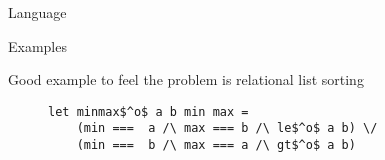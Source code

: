 \documentclass[final]{beamer}
\newlength{\onecolwid}
\begin{document}
\begin{frame}[fragile]
\begin{columns}[t]
\begin{column}{\onecolwid}
\begin{block}{Language}
\begin{comment}
Classical MiniKanren relation example is concatenation of two lists.

\begin{figure}
\begin{lstlisting}
   let rec append$^o$ x y xy =
     (x === [] /\ y === xy) \/
     (fresh (h t)
       (x === h :: t) /\
       (fresh (ty)
	  	(append$^o$ t y ty)		(* 1 *)
		(h :: ty === xy) /\	 (* 2 *)
       )
     )
\end{lstlisting}
\end{figure}

We can use this definition to find concatenation

\begin{figure}
\begin{lstlisting}
run 1 (fun q -> append$^o$ [1; 2] [3] q) $\leadsto$ {q=[1; 2; 3]}
\end{lstlisting}
\end{figure}

or to find splitings of the list

\begin{figure}
\begin{lstlisting}
run 3 (fun q r -> append$^o$ q r [1; 2; 3]) $\leadsto$
{q=[], r=[1; 2]; q=[1], r=[2]; q=[], r=[1; 2]}
\end{lstlisting}
\end{figure}

We also can request all answers.

\begin{figure}
\begin{lstlisting}
run * (fun q r -> append$^o$ q r [1; 2; 3])
\end{lstlisting}
\end{figure}

But this query diverges.

The reason is non-comutativity of conjunction.

There we can swap last two goals and get refutationally complete relation. But it won't work in more complicated examples.

\end{comment}

\end{block}

\begin{block}{Examples}

Good example to feel the problem is relational list sorting

\begin{figure}
\begin{lstlisting}
let minmax$^o$ a b min max =
	(min ===  a /\ max === b /\ le$^o$ a b) \/
	(min ===  b /\ max === a /\ gt$^o$ a b)


\end{lstlisting}
\end{figure}
\end{block}
\end{column}
\end{columns}
\end{frame}
\end{document}
